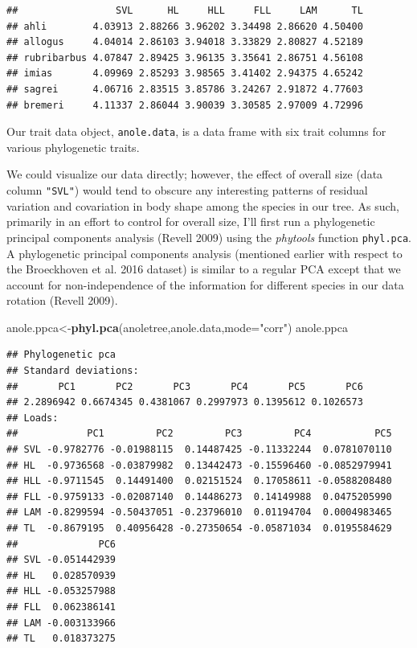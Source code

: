 \documentclass[fleqn,10pt,lineno]{wlpeerj}
\newenvironment{Shaded}{\begin{snugshade}}{\end{snugshade}}
\newcommand{\AttributeTok}[1]{\textcolor[rgb]{0.13,0.29,0.53}{#1}}
\newcommand{\FunctionTok}[1]{\textcolor[rgb]{0.13,0.29,0.53}{\textbf{#1}}}
\newcommand{\NormalTok}[1]{#1}
\newcommand{\OtherTok}[1]{\textcolor[rgb]{0.56,0.35,0.01}{#1}}
\newcommand{\StringTok}[1]{\textcolor[rgb]{0.31,0.60,0.02}{#1}}
\begin{document}
\begin{verbatim}
##                 SVL      HL     HLL     FLL     LAM      TL
## ahli        4.03913 2.88266 3.96202 3.34498 2.86620 4.50400
## allogus     4.04014 2.86103 3.94018 3.33829 2.80827 4.52189
## rubribarbus 4.07847 2.89425 3.96135 3.35641 2.86751 4.56108
## imias       4.09969 2.85293 3.98565 3.41402 2.94375 4.65242
## sagrei      4.06716 2.83515 3.85786 3.24267 2.91872 4.77603
## bremeri     4.11337 2.86044 3.90039 3.30585 2.97009 4.72996
\end{verbatim}

Our trait data object, \texttt{anole.data}, is a data frame with six
trait columns for various phylogenetic traits.

We could visualize our data directly; however, the effect of overall
size (data column \texttt{"SVL"}) would tend to obscure any interesting
patterns of residual variation and covariation in body shape among the
species in our tree. As such, primarily in an effort to control for
overall size, I'll first run a phylogenetic principal components
analysis (Revell 2009) using the \emph{phytools} function
\texttt{phyl.pca}. A phylogenetic principal components analysis
(mentioned earlier with respect to the Broeckhoven et al. 2016 dataset)
is similar to a regular PCA except that we account for non-independence
of the information for different species in our data rotation (Revell
2009).

\begin{Shaded}
\begin{Highlighting}[]
\NormalTok{anole.ppca}\OtherTok{\textless{}{-}}\FunctionTok{phyl.pca}\NormalTok{(anoletree,anole.data,}\AttributeTok{mode=}\StringTok{"corr"}\NormalTok{)}
\NormalTok{anole.ppca}
\end{Highlighting}
\end{Shaded}

\begin{verbatim}
## Phylogenetic pca
## Standard deviations:
##       PC1       PC2       PC3       PC4       PC5       PC6 
## 2.2896942 0.6674345 0.4381067 0.2997973 0.1395612 0.1026573 
## Loads:
##            PC1         PC2         PC3         PC4           PC5
## SVL -0.9782776 -0.01988115  0.14487425 -0.11332244  0.0781070110
## HL  -0.9736568 -0.03879982  0.13442473 -0.15596460 -0.0852979941
## HLL -0.9711545  0.14491400  0.02151524  0.17058611 -0.0588208480
## FLL -0.9759133 -0.02087140  0.14486273  0.14149988  0.0475205990
## LAM -0.8299594 -0.50437051 -0.23796010  0.01194704  0.0004983465
## TL  -0.8679195  0.40956428 -0.27350654 -0.05871034  0.0195584629
##              PC6
## SVL -0.051442939
## HL   0.028570939
## HLL -0.053257988
## FLL  0.062386141
## LAM -0.003133966
## TL   0.018373275
\end{verbatim}
\end{document}
